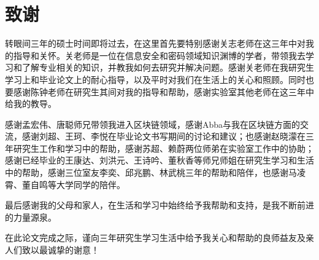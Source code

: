 
\chapter{致谢}

转眼间三年的硕士时间即将过去，在这里首先要特别感谢关志老师在这三年中对我的指导和关怀。关老师是一位在信息安全和密码领域知识渊博的学者，带领我去学习和了解专业相关的知识，并教我如何去研究并解决问题。感谢关老师在我研究生学习上和毕业论文上的耐心指导，以及平时对我们在生活上的关心和照顾。同时也要感谢陈钟老师在研究生其间对我的指导和帮助，感谢实验室其他老师在这三年中给我的教导。

感谢孟宏伟、唐聪师兄带领我进入区块链领域，感谢Abba与我在区块链方面的交流，感谢刘超、王珂、李悦在毕业论文书写期间的讨论和建议；也感谢赵晓濛在三年研究生工作和学习中的帮助，感谢苏超、赖蔚两位师弟在实验室工作中的协助；感谢已经毕业的王康达、刘洪元、王诗吟、董秋香等师兄师姐在研究生学习和生活中的帮助，感谢三位室友李奕、邱兆鹏、林武桃三年的帮助和陪伴，也感谢马凌霄、董自鸣等大学同学的陪伴。

最后感谢我的父母和家人，在生活和学习中始终给予我帮助和支持，是我不断前进的力量源泉。

在此论文完成之际，谨向三年研究生学习生活中给予我关心和帮助的良师益友及亲人们致以最诚挚的谢意！





